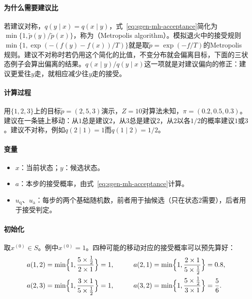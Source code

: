 \paragraph{为什么需要建议比}
若建议对称，$q(y\mid x)=q(x\mid y)$，式~\eqref{eq:sgen-mh-acceptance}简化为$\min\{1,\widetilde{p}(y)/\widetilde{p}(x)\}$，称为（Metropolis algorithm）。模拟退火中的接受规则$\min\{1,\exp(-(f(y)-f(x))/T)\}$就是取$\widetilde{p}=\exp(-f/T)$的Metropolis规则。建议不对称时若仍用这个简化的比值，不变分布就会偏离目标，下面的三状态例子会算出偏离的结果。$q(x\mid y)/q(y\mid x)$这一项就是对建议偏向的修正：建议更爱往$y$走，就相应减少往$y$走的接受。

\paragraph{计算过程}
用$\{1,2,3\}$上的目标$\widetilde{p}=(2,5,3)$演示，$Z=10$对算法未知，$\pi=(0.2,0.5,0.3)$。建议在一条链上移动：从$1$总是建议$2$，从$3$总是建议$2$，从$2$以各$1/2$的概率建议$1$或$3$。建议不对称，例如$q(2\mid1)=1$而$q(1\mid2)=1/2$。

\paragraph{变量}
\begin{itemize}
  \item $x$：当前状态；$y$：候选状态。
  \item $a$：本步的接受概率，由式~\eqref{eq:sgen-mh-acceptance}计算。
  \item $u_{\mathrm{q}}$、$u_{\mathrm{a}}$：每步的两个基础随机数，前者用于抽候选（只在状态$2$需要），后者用于接受判定。
\end{itemize}

\paragraph{初始化}
取$x^{(0)}\in S$。例中$x^{(0)}=1$。四种可能的移动对应的接受概率可以预先算好：
\[
  \begin{aligned}
    a(1,2)&=\min\Bigl\{1,\frac{5\times\frac12}{2\times1}\Bigr\}=1,&\qquad
    a(2,1)&=\min\Bigl\{1,\frac{2\times1}{5\times\frac12}\Bigr\}=0.8,\\
    a(2,3)&=\min\Bigl\{1,\frac{3\times1}{5\times\frac12}\Bigr\}=1,&\qquad
    a(3,2)&=\min\Bigl\{1,\frac{5\times\frac12}{3\times1}\Bigr\}=\frac56.
  \end{aligned}
\]

